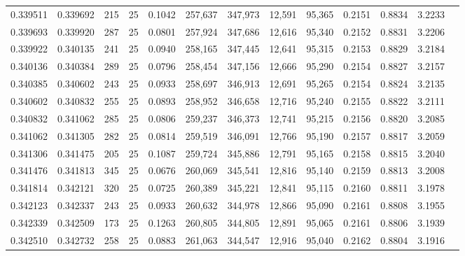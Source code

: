\begin{tabular}{rrrrrrrrrrrrr}
0.339511 & 0.339692 &   215 &  25 &                                     0.1042 & 257,637 & 347,973 &  12,591 &  95,365 & 0.2151 & 0.8834 & 3.2233 \\
0.339693 & 0.339920 &   287 &  25 &                                     0.0801 & 257,924 & 347,686 &  12,616 &  95,340 & 0.2152 & 0.8831 & 3.2206 \\
0.339922 & 0.340135 &   241 &  25 &                                     0.0940 & 258,165 & 347,445 &  12,641 &  95,315 & 0.2153 & 0.8829 & 3.2184 \\
0.340136 & 0.340384 &   289 &  25 &                                     0.0796 & 258,454 & 347,156 &  12,666 &  95,290 & 0.2154 & 0.8827 & 3.2157 \\
0.340385 & 0.340602 &   243 &  25 &                                     0.0933 & 258,697 & 346,913 &  12,691 &  95,265 & 0.2154 & 0.8824 & 3.2135 \\
0.340602 & 0.340832 &   255 &  25 &                                     0.0893 & 258,952 & 346,658 &  12,716 &  95,240 & 0.2155 & 0.8822 & 3.2111 \\
0.340832 & 0.341062 &   285 &  25 &                                     0.0806 & 259,237 & 346,373 &  12,741 &  95,215 & 0.2156 & 0.8820 & 3.2085 \\
0.341062 & 0.341305 &   282 &  25 &                                     0.0814 & 259,519 & 346,091 &  12,766 &  95,190 & 0.2157 & 0.8817 & 3.2059 \\
0.341306 & 0.341475 &   205 &  25 &                                     0.1087 & 259,724 & 345,886 &  12,791 &  95,165 & 0.2158 & 0.8815 & 3.2040 \\
0.341476 & 0.341813 &   345 &  25 &                                     0.0676 & 260,069 & 345,541 &  12,816 &  95,140 & 0.2159 & 0.8813 & 3.2008 \\
0.341814 & 0.342121 &   320 &  25 &                                     0.0725 & 260,389 & 345,221 &  12,841 &  95,115 & 0.2160 & 0.8811 & 3.1978 \\
0.342123 & 0.342337 &   243 &  25 &                                     0.0933 & 260,632 & 344,978 &  12,866 &  95,090 & 0.2161 & 0.8808 & 3.1955 \\
0.342339 & 0.342509 &   173 &  25 &                                     0.1263 & 260,805 & 344,805 &  12,891 &  95,065 & 0.2161 & 0.8806 & 3.1939 \\
0.342510 & 0.342732 &   258 &  25 &                                     0.0883 & 261,063 & 344,547 &  12,916 &  95,040 & 0.2162 & 0.8804 & 3.1916 \\

\end{tabular}
